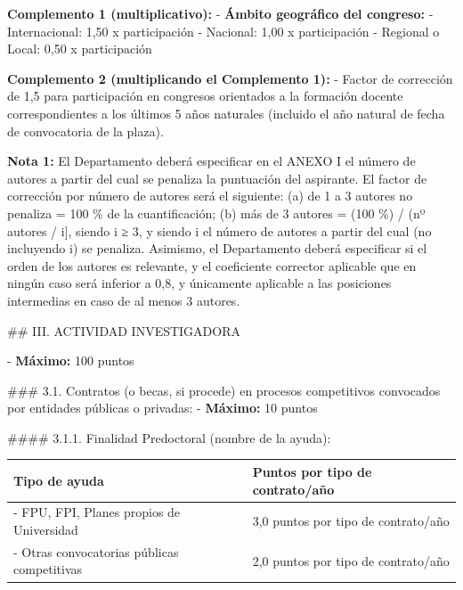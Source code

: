 \documentclass{article}
\begin{document}
\begin{itemize}
\begin{itemize}
\begin{scriptsize}
                  \textbf{Complemento 1 (multiplicativo):}
                  - \textbf{Ámbito geográfico del congreso:}
                  - Internacional: 1,50 x participación
                  - Nacional: 1,00 x participación
                  - Regional o Local: 0,50 x participación

                  \textbf{Complemento 2 (multiplicando el Complemento 1):}
                  - Factor de corrección de 1,5 para participación en congresos orientados a la formación docente correspondientes a los últimos 5 años naturales (incluido el año natural de fecha de convocatoria de la plaza).

                  \textbf{Nota 1:} El Departamento deberá especificar en el ANEXO I el número de autores a partir del cual se penaliza la puntuación del aspirante. El factor de corrección por número de autores será el siguiente: (a) de 1 a 3 autores no penaliza = 100 \% de la cuantificación; (b) más de 3 autores = (100 \%) / (nº autores / i], siendo i ≥ 3, y siendo i el número de autores a partir del cual (no incluyendo i) se penaliza. Asimismo, el Departamento deberá especificar si el orden de los autores es relevante, y el coeficiente corrector aplicable que en ningún caso será inferior a 0,8, y únicamente aplicable a las posiciones intermedias en caso de al menos 3 autores.

                  \#\# III. ACTIVIDAD INVESTIGADORA

                  - \textbf{Máximo:} 100 puntos

                  \#\#\# 3.1. Contratos (o becas, si procede) en procesos competitivos convocados por entidades públicas o privadas:
                  - \textbf{Máximo:} 10 puntos

                  \#\#\#\# 3.1.1. Finalidad Predoctoral (nombre de la ayuda):
                  \vspace{0.4cm}
                  \begin{table}[h!]\centering\renewcommand{\arraystretch}{1.3}
                    \begin{tabular}{|p{}|p{}|}\hline
                      Tipo de ayuda                               & Puntos por tipo de contrato/año     \\\hline
                      - FPU, FPI, Planes propios de Universidad   & 3,0 puntos por tipo de contrato/año \\\hline
                      - Otras convocatorias públicas competitivas & 2,0 puntos por tipo de contrato/año \\\hline
                    \end{tabular}\end{table}
                  \vspace{0.4cm}


\end{scriptsize}
\end{itemize}
\end{itemize}
\end{document}
